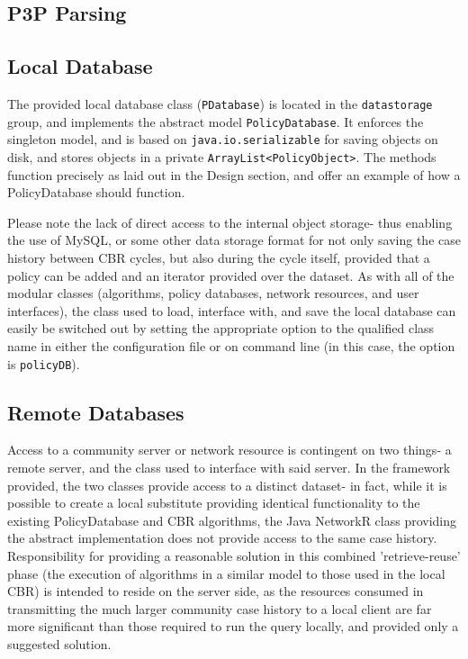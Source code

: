 \subsection{P3P Parsing}  %

\subsection{Local Database}
The provided local database class (\texttt{PDatabase}) is located in the \texttt{datastorage} group, and implements the abstract model \texttt{PolicyDatabase}. It enforces the singleton model, and is based on \texttt{java.io.serializable} for saving objects on disk, and stores objects in a private \texttt{ArrayList<PolicyObject>}. The methods function precisely as laid out in the Design section, and offer an example of how a PolicyDatabase should function.

Please note the lack of direct access to the internal object storage- thus enabling the use of MySQL, or some other data storage format for not only saving the case history between CBR cycles, but also during the cycle itself, provided that a policy can be added and an iterator provided over the dataset. As with all of the modular classes (algorithms, policy databases, network resources, and user interfaces), the class used to load, interface with, and save the local database can easily be switched out by setting the appropriate  option to the qualified class name in either the configuration file or on command line (in this case, the option is \texttt{policyDB}).

\subsection{Remote Databases}  %
Access to a community server or network resource is contingent on two things- a remote server, and the class used to interface with said server. In the framework provided, the two classes provide access to a distinct dataset- in fact, while it is possible to create a local substitute providing identical functionality to the existing PolicyDatabase and CBR algorithms, the Java NetworkR class providing the abstract implementation does not provide access to the same case history. Responsibility for providing a reasonable solution in this combined 'retrieve-reuse' phase (the execution of algorithms in a similar model to those used in the local CBR) is intended to reside on the server side, as the resources consumed in transmitting the much larger community case history to a local client are far more significant than those required to run the query locally, and provided only a suggested solution.

